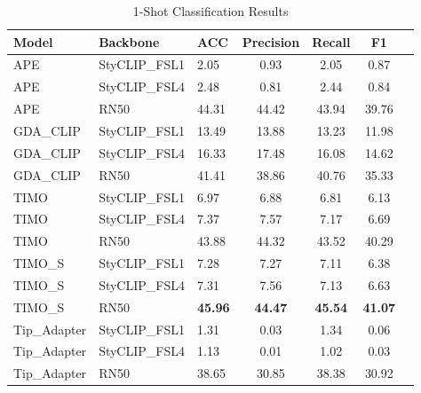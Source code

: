 \documentclass[conference,6pt]{IEEEtran}
\begin{document}
\begin{table}[H]
\centering
\tiny
\caption{1-Shot Classification Results}
\label{tab:results_1shot}
\begin{tabular}{@{}lll*{4}{S[table-format=2.2]}@{}}
\toprule
\textbf{Model} & \textbf{Backbone} & \textbf{ACC} & \textbf{Precision} & \textbf{Recall} & \textbf{F1} \\
\midrule
APE & StyCLIP\_FSL1 & 2.05 & 0.93 & 2.05 & 0.87 \\
APE & StyCLIP\_FSL4 & 2.48 & 0.81 & 2.44 & 0.84 \\
APE & RN50 & 44.31 & 44.42 & 43.94 & 39.76 \\
GDA\_CLIP & StyCLIP\_FSL1 & 13.49 & 13.88 & 13.23 & 11.98 \\
GDA\_CLIP & StyCLIP\_FSL4 & 16.33 & 17.48 & 16.08 & 14.62 \\
GDA\_CLIP & RN50 & 41.41 & 38.86 & 40.76 & 35.33 \\
TIMO & StyCLIP\_FSL1 & 6.97 & 6.88 & 6.81 & 6.13 \\
TIMO & StyCLIP\_FSL4 & 7.37 & 7.57 & 7.17 & 6.69 \\
TIMO & RN50 & 43.88 & 44.32 & 43.52 & 40.29 \\
TIMO\_S & StyCLIP\_FSL1 & 7.28 & 7.27 & 7.11 & 6.38 \\
TIMO\_S & StyCLIP\_FSL4 & 7.31 & 7.56 & 7.13 & 6.63 \\
TIMO\_S & RN50 & \textbf{45.96} & \textbf{44.47} & \textbf{45.54} & \textbf{41.07} \\
Tip\_Adapter & StyCLIP\_FSL1 & 1.31 & 0.03 & 1.34 & 0.06 \\
Tip\_Adapter & StyCLIP\_FSL4 & 1.13 & 0.01 & 1.02 & 0.03 \\
Tip\_Adapter & RN50 & 38.65 & 30.85 & 38.38 & 30.92 \\
\bottomrule
\end{tabular}
\end{table}
\end{document}
